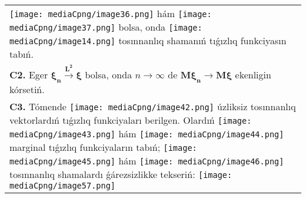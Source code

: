 \documentclass{article}
\begin{document}
\begin{tabular}{m{17cm}}
\texttt{[image: mediaCpng/image36.png]} hám \texttt{[image: mediaCpng/image37.png]}
bolsa, onda \texttt{[image: mediaCpng/image14.png]} tosınnanlıq shamanıń tıǵızlıq funkciyasın tabıń.
 \\
\textbf{C2.} Eger \(\mathbf{\xi}_{\mathbf{n}}\overset{\mathbf{L}^{\mathbf{2}}}{\rightarrow}\mathbf{\xi}\) bolsa, onda \(n \rightarrow \infty\) de \(\mathbf{M}\mathbf{\xi}_{\mathbf{n}}\mathbf{\rightarrow M\xi}\) ekenligin kórsetiń.
 \\
\textbf{C3.} Tómende \texttt{[image: mediaCpng/image42.png]} úzliksiz tosınnanlıq vektorlardıń tıǵızlıq funkciyaları berilgen. Olardıń \texttt{[image: mediaCpng/image43.png]} hám \texttt{[image: mediaCpng/image44.png]} marginal tıǵızlıq funkciyaların tabıń; \texttt{[image: mediaCpng/image45.png]} hám \texttt{[image: mediaCpng/image46.png]} tosınnanlıq shamalardı ǵárezsizlikke tekseriń: \texttt{[image: mediaCpng/image57.png]}
 \\

\end{tabular}
\vspace{1cm}
\end{document}
